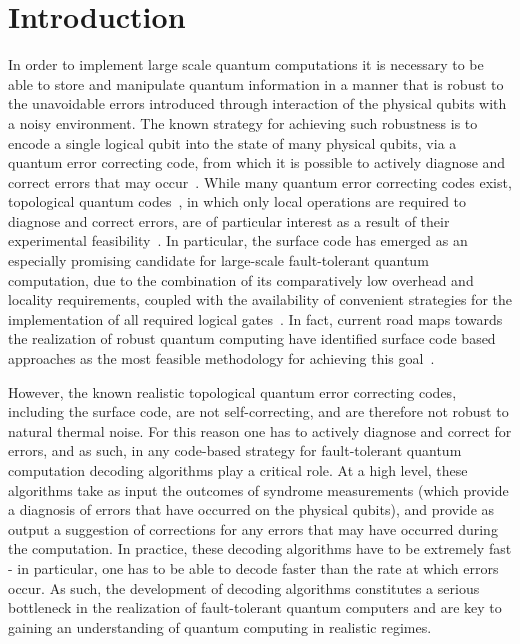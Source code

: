 \documentclass[twocolumn,preprintnumbers,amsmath,amssymb,notitlepage,nofootinbib,longbibliography,superscriptaddress,aps,pra,10pt]{revtex4-1}
\begin{document}
\section{Introduction}\label{s:introduction}
	In order to implement large scale quantum computations it is necessary to be able to store and manipulate quantum information in a manner that is robust to the unavoidable errors introduced through interaction of the physical qubits with a noisy environment.
	The known strategy for achieving such robustness is to encode a single logical qubit into the state of many physical qubits, via a quantum error correcting code, from which it is possible to actively diagnose and correct errors that may occur~\cite{Terhal15,Campbell17}.
	While many quantum error correcting codes exist, topological quantum codes~\cite{Kitaev03, Dennis02, Preskill17lectures, Nayak08, Pachos12, Terhal15, Brown16, Campbell17}, in which only local operations are required to diagnose and correct errors, are of particular interest as a result of their experimental feasibility~\cite{Reed12, Barends14, Nigg14, Corcoles15, Albrecht16, Takita16, Linke17}.
	In particular, the surface code has emerged as an especially promising candidate for large-scale fault-tolerant quantum computation, due to the combination of its comparatively low overhead and locality requirements, coupled with the availability of convenient strategies for the implementation of all required logical gates~\cite{Fowler18,Litinski18b}.
	In fact, current road maps towards the realization of robust quantum computing have identified surface code based approaches as the most feasible methodology for achieving this goal~\cite{Roadmap}.

	However, the known realistic topological quantum error correcting codes, including the surface code, are not self-correcting, and are therefore not robust to natural thermal noise.
	For this reason one has to actively diagnose and correct for errors, and as such, in any code-based strategy for fault-tolerant quantum computation decoding algorithms play a critical role.
	At a high level, these algorithms take as input the outcomes of syndrome measurements (which provide a diagnosis of errors that have occurred on the physical qubits), and provide as output a suggestion of corrections for any errors that may have occurred during the computation.
	In practice, these decoding algorithms have to be extremely fast - in particular, one has to be able to decode faster than the rate at which errors occur.
	As such, the development of decoding algorithms constitutes a serious bottleneck in the realization of fault-tolerant quantum computers and are key to gaining an understanding of quantum computing in realistic regimes.
\end{document}
